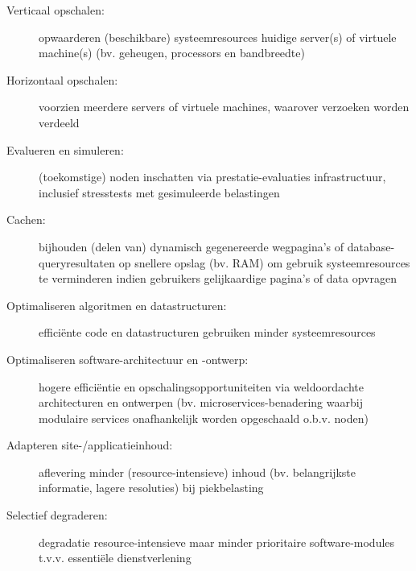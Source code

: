 \begin{description}
    \item [Verticaal opschalen:] opwaarderen (beschikbare)
    systeemresources huidige server(s) of virtuele machine(s)
    (bv. geheugen, processors en bandbreedte)
    \cite{lu2014applicationdriven, michael2007scaleup, appuswamy2013scaleup}

    \item [Horizontaal opschalen:] voorzien meerdere servers of virtuele
    machines, waarover verzoeken worden verdeeld
    \cite{lu2014applicationdriven, michael2007scaleup}

    \item [Evalueren en simuleren:] (toekomstige) noden inschatten
    via prestatie-evaluaties infrastructuur, inclusief
    stresstests met gesimuleerde belastingen
    \cite{penaortiz2015generating, penaortiz2013analyzing, penaortiz2015new}

    \item [Cachen:] bijhouden (delen van) dynamisch gegenereerde wegpagina's
    of database-queryresultaten op snellere opslag (bv. RAM)
    om gebruik systeemresources te verminderen indien gebruikers
    gelijkaardige pagina's of data opvragen
    \cite{sivasubramanian2007analysis,amazon2023whatiscaching}
    
    \item [Optimaliseren algoritmen en datastructuren:] efficiënte code en
    datastructuren gebruiken minder systeemresources
    \cite{feitelson2015introduction}

    \item [Optimaliseren software-architectuur en -ontwerp:] hogere
    efficiëntie \cite{feitelson2015introduction} en
    opschalingsopportuniteiten via weldoordachte
    architecturen en ontwerpen (bv. microservices-benadering waarbij modulaire
    services onafhankelijk worden opgeschaald o.b.v. noden)
    \cite{coulson2020adaptive, thones2015microservices}

    \item [Adapteren site-/applicatieinhoud:]
    aflevering minder (resource-intensieve) inhoud
    (bv. belangrijkste informatie, lagere resoluties)
    bij piekbelasting
    \cite{andersson2006design, abdelzaher1999web, gophstein2011trading}

    \item [Selectief degraderen:]
    degradatie resource-intensieve maar minder prioritaire software-modules
    t.v.v. essentiële dienstverlening
    \cite{wang2012towards}


\end{description}

